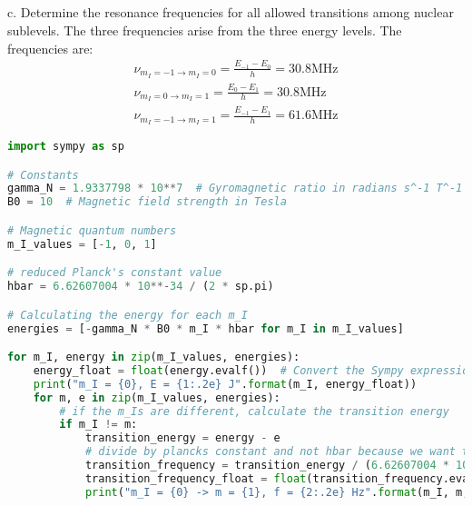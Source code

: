 \documentclass[12pt]{article}
\begin{document}
\subsection{}
c. Determine the resonance frequencies for all allowed transitions among nuclear sublevels.
The three frequencies arise from the three energy levels. The frequencies are:
\begin{align}
  \nu_{m_I = -1\rightarrow m_I = 0} = \frac{E_{-1} - E_{0}}{h} = 30.8\text{MHz}\\
  \nu_{m_I = 0\rightarrow m_I = 1} = \frac{E_{0} - E_{1}}{h} = 30.8\text{MHz}\\
  \nu_{m_I = -1\rightarrow m_I = 1} = \frac{E_{-1} - E_{1}}{h} = 61.6\text{MHz}
\end{align}
\begin{lstlisting}[language=Python]
import sympy as sp

# Constants
gamma_N = 1.9337798 * 10**7  # Gyromagnetic ratio in radians s^-1 T^-1
B0 = 10  # Magnetic field strength in Tesla

# Magnetic quantum numbers
m_I_values = [-1, 0, 1]

# reduced Planck's constant value
hbar = 6.62607004 * 10**-34 / (2 * sp.pi)

# Calculating the energy for each m_I
energies = [-gamma_N * B0 * m_I * hbar for m_I in m_I_values]

for m_I, energy in zip(m_I_values, energies):
    energy_float = float(energy.evalf())  # Convert the Sympy expression to a float
    print("m_I = {0}, E = {1:.2e} J".format(m_I, energy_float))
    for m, e in zip(m_I_values, energies):
        # if the m_Is are different, calculate the transition energy
        if m_I != m:
            transition_energy = energy - e
            # divide by plancks constant and not hbar because we want the frequency
            transition_frequency = transition_energy / (6.62607004 * 10**-34)
            transition_frequency_float = float(transition_frequency.evalf())
            print("m_I = {0} -> m = {1}, f = {2:.2e} Hz".format(m_I, m, transition_frequency_float))


\end{lstlisting}
\end{document}
